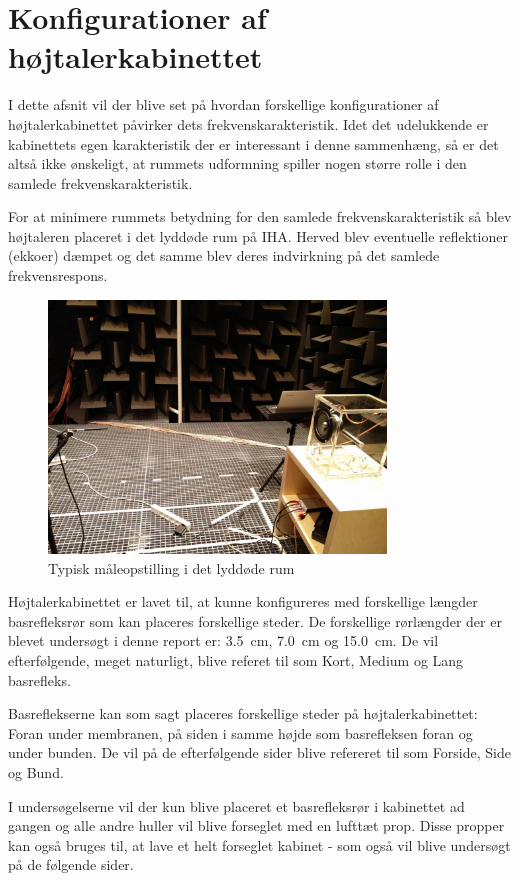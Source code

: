 \section{Konfigurationer af højtalerkabinettet}
I dette afsnit vil der blive set på hvordan forskellige konfigurationer af højtalerkabinettet påvirker dets frekvenskarakteristik. Idet det udelukkende er kabinettets egen karakteristik der er interessant i denne sammenhæng, så er det altså ikke ønskeligt, at rummets udformning spiller nogen større rolle i den samlede frekvenskarakteristik.

For at minimere rummets betydning for den samlede frekvenskarakteristik så blev højtaleren placeret i det lyddøde rum på IHA. Herved blev eventuelle reflektioner (ekkoer) dæmpet og det samme blev deres indvirkning på det samlede frekvensrespons.
\begin{figure}[H]
	\centering
	\includegraphics[width=0.8\textwidth]{Billeder/LyddodtRum}
	\caption{Typisk måleopstilling i det lyddøde rum}
\end{figure}

Højtalerkabinettet er lavet til, at kunne konfigureres med forskellige længder basrefleksrør som kan placeres forskellige steder. De forskellige rørlængder der er blevet undersøgt i denne report er: \SI{3,5}{\centi\meter}, \SI{7,0}{\centi\meter} og \SI{15,0}{\centi\meter}. De vil efterfølgende, meget naturligt, blive referet til som Kort, Medium og Lang basrefleks.

Basreflekserne kan som sagt placeres forskellige steder på højtalerkabinettet: Foran under membranen, på siden i samme højde som basrefleksen foran og under bunden. De vil på de efterfølgende sider blive refereret til som Forside, Side og Bund.

I undersøgelserne vil der kun blive placeret et basrefleksrør i kabinettet ad gangen og alle andre huller vil blive forseglet med en lufttæt prop. Disse propper kan også bruges til, at lave et helt forseglet kabinet - som også vil blive undersøgt på de følgende sider.



